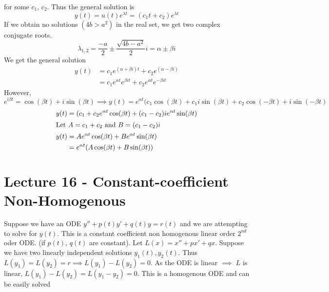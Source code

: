 \documentclass[a6paper]{article}
\theoremstyle{definition}
\theoremstyle{plain}
\theoremstyle{remark}
\begin{document}
for some $ c_1 $, $ c_2 $. Thus the general solution is
$$ y(t) = u(t) e^{\lambda t} = (c_1 t + c_2) e^{\lambda t} $$
If we obtain no solutions $ (4b > a^2) $ in the real set, we get two complex
conjugate roots.
$$ \lambda_{1,2} = \frac{-a}{2} \pm \frac{\sqrt{4b - a^2}}{2}i = \alpha \pm
\beta i $$
We get the general solution
\begin{align*}
  y(t) &= c_1 e^{(\alpha + \beta i)t} + c_2 e^{(\alpha - \beta i)} \\
       &= c_1 e^{\alpha t} e^{\beta i t} + c_2 e^{\alpha t} e^{-\beta i t}
\end{align*}
However, $ e^{i\beta t} = \cos (\beta t) + i \sin (\beta t) \implies y(t)
= e^{\alpha t} (c_1 \cos(\beta t) + c_1 i \sin (\beta t) + c_2 \cos(-\beta t)
+ i \sin (-\beta t) $
\begin{align*}
  y(t) &= (c_1 + c_2 e^{\alpha t} \cos(\beta t) + (c_1 - c_2) ie^{\alpha t}
  \sin (\beta t)\\
  \intertext{Let $ A = c_1 + c_2 $ and $ B = (c_1 - c_2)i $ }
  y(t) &= Ae^{\alpha t} \cos (\beta t) + B e^{\alpha t} \sin (\beta t)\\
       &= e^{\alpha t} (A\cos (\beta t) + B \sin (\beta t))
\end{align*}
\section{Lecture 16 - Constant-coefficient Non-Homogenous}
Suppose we have an ODE $ y'' + p(t)y' + q(t)y = r(t) $ and we are attempting to
solve for $ y(t) $. This is a constant coefficient non homogenous linear order
$ 2^{nd} $ oder ODE. (if $ p(t) $, $ q(t) $ are constant). Let $ L(x) = x''
+ px' + qx $. Suppose we have two linearly independent solutions $ y_1(t),
y_2(t) $. Thus $ L(y_1) = L(y_2) = r \implies L(y_1) - L(y_2) = 0 $. As the ODE
is linear $ \implies $ $ L $ is linear, $ L(y_1) - L(y_2) = L(y_1 - y_2) = 0 $.
This is a homogenous ODE and can be easily solved
\end{document}
